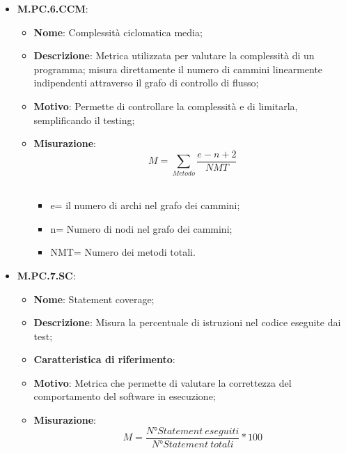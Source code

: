 \documentclass[10pt, a4paper]{article}
\begin{document}
\begin{itemize}
  \item \textbf{M.PC.6.CCM}:
    \begin{itemize}
        \item \textbf{Nome}: Complessità ciclomatica media;
        \item \textbf{Descrizione}: Metrica utilizzata per valutare la complessità di un programma; misura direttamente il numero di cammini linearmente indipendenti attraverso il grafo di controllo di flusso;
        \item \textbf{Motivo}: Permette di controllare la complessità e di limitarla, semplificando il testing;
        \item \textbf{Misurazione}: \[ M=\sum_{Metodo} \frac{e-n+2}{NMT} \] \\
         \begin{itemize}
        \item e= il numero di archi nel grafo dei cammini;
        \item n= Numero di nodi nel grafo dei cammini;
        \item NMT= Numero dei metodi totali.\\
        \end{itemize}
   \end{itemize}
   
    \item \textbf{M.PC.7.SC}:
    \begin{itemize}
        \item \textbf{Nome}: Statement coverage;
        \item \textbf{Descrizione}: Misura la percentuale di istruzioni nel codice eseguite dai test;
        \item \textbf{Caratteristica di riferimento}:
        \item \textbf{Motivo}: Metrica che permette di valutare la correttezza del comportamento del software in esecuzione;
        \item \textbf{Misurazione}:  \[M=\frac{N° Statement
        \ eseguiti}{N° Statement\ totali} * 100 \] \\
    \end{itemize}




\end{itemize}
\end{document}
